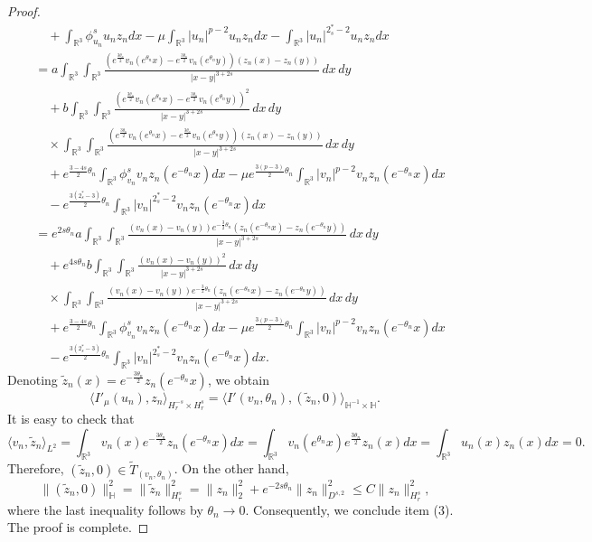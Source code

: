 \documentclass[11pt]{article}
\numberwithin{equation}{section}
\begin{document}
\begin{proof}
\begin{align*}
&\quad +\int_{\mathbb{R}^3}\phi^s_{u_n}{u_n}z_ndx
 -\mu\int_{\mathbb{R}^3}|u_n|^{p-2}u_n z_ndx-\int_{\mathbb{R}^3}|u_n|^{2^*_s-2}u_n z_ndx\\
&=  a\int_{\mathbb{R}^3}\int_{\mathbb{R}^3}\frac{(e^{\frac{3\theta_n}{2}}
 v_n(e^{\theta_n} x)-e^{\frac{3\theta_n}{2}}v_n(e^{\theta_n} y))(z_n(x)
 -z_n(y))}{|x-y|^{3+2s}}\,dx\,dy\\
&\quad +b\int_{\mathbb{R}^3}\int_{\mathbb{R}^3}
 \frac{(e^{\frac{3\theta_n}{2}}v_n(e^{\theta_n} x)-e^{\frac{3\theta_n}{2}}
 v_n(e^{\theta_n} y))^2}{|x-y|^{3+2s}}\,dx\,dy \\
 &\quad\times \int_{\mathbb{R}^3}
 \int_{\mathbb{R}^3}\frac{(e^{\frac{3\theta_n}{2}}v_n(e^{\theta_n } x)
 -e^{\frac{3\theta_n}{2}}v_n(e^{\theta_n} y))(z_n(x)-z_n(y))}{|x-y|^{3+2s}}\,dx\,dy\\
&\quad +e^{\frac{3-4s}{2}\theta_n}\int_{\mathbb{R}^3}\phi^s_{v_n}{v_n}
 z_n(e^{-\theta_n}x)dx-\mu e^{\frac{3(p-3)}{2}\theta_n}\int_{\mathbb{R}^3}
 |v_n|^{p-2}v_n z_n(e^{-\theta_n}x) dx\\
&\quad -e^{\frac{3(2^*_s-3)}{2}\theta_n}\int_{\mathbb{R}^3}|v_n|^{2^*_s-2}
 v_n z_n(e^{-\theta_n}x) dx\\
&= e^{2s\theta_n}a\int_{\mathbb{R}^3}\int_{\mathbb{R}^3}\frac{(v_n(x)-v_n(y))
 e^{-\frac{3}{2}\theta_n}(z_n(e^{-\theta_n} x)-z_n(e^{-\theta_n}y))}
  {|x-y|^{3+2s}}\,dx\,dy\\
&\quad +e^{4s\theta_n}b\int_{\mathbb{R}^3}\int_{\mathbb{R}^3}
 \frac{(v_n( x)-v_n( y))^2}{|x-y|^{3+2s}}\,dx\,dy \\
 &\quad\times  \int_{\mathbb{R}^3}\int_{\mathbb{R}^3}\frac{(v_n( x)-v_n( y))
 e^{-\frac{3}{2}\theta_n}(z_n(e^{-\theta_n} x)
 -z_n(e^{-\theta_n}y))}{|x-y|^{3+2s}}\,dx\,dy  \\
&\quad +e^{\frac{3-4s}{2}\theta_n}\int_{\mathbb{R}^3}\phi^s_{v_n}{v_n}z_n
 (e^{-\theta_n}x)dx-\mu e^{\frac{3(p-3)}{2}\theta_n}
 \int_{\mathbb{R}^3}|v_n|^{p-2}v_n z_n(e^{-\theta_n}x) dx\\
&\quad -e^{\frac{3(2^*_s-3)}{2}\theta_n}\int_{\mathbb{R}^3}|v_n|^{2^*_s-2}
v_n z_n(e^{-\theta_n}x) dx.
\end{align*}
Denoting $\tilde{z}_n(x)=e^{-\frac{3\theta_n}{2}}z_n(e^{-\theta_n}x)$,
 we obtain
$$
\langle I'_\mu(u_n),z_n\rangle_{{H^{-s}_r}\times H^s_r}
=\langle I'(v_n, \theta_n), (\tilde{z}_n, 0) \rangle_{\mathbb{H}^{-1}\times \mathbb{H}}.
$$
It is easy to check that
\[  %
 \langle v_n, \tilde{z}_n\rangle_{L^2}=\int_{\mathbb{R}^3} v_n(x) e^{-\frac{3\theta_n}{2}}z_n(e^{-\theta_n}x)dx
 =\int_{\mathbb{R}^3} v_n(e^{\theta_n}x) e^{\frac{3\theta_n}{2}}z_n(x)dx
 =\int_{\mathbb{R}^3}u_n(x)z_n(x)dx=0.
\]
Therefore, $(\tilde{z}_n, 0)\in \tilde{T}_{(v_n, \theta_n)}$.
On the other hand,
$$
\|(\tilde{z}_n,0)\|^2_{\mathbb{H}}=\|\tilde{z}_n\|^2_{{H^s_r}}=\|z_n\|^2_2
+e^{-2s\theta_n}\|z_n\|^2_{D^{s,2}}\leq C\|z_n\|^2_{H^s_r},
$$
where the last inequality follows by $\theta_n\to 0$. Consequently, we conclude
item (3). The proof is complete.
\end{proof}
\end{document}

